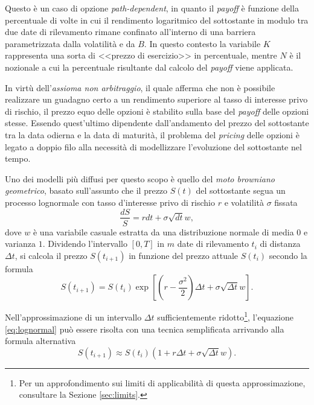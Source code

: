 Questo è un caso di opzione \textit{path-dependent}, in quanto il \textit{payoff} è funzione della percentuale di volte in cui il rendimento logaritmico del sottostante in modulo tra due date di rilevamento rimane confinato all'interno di una barriera parametrizzata dalla volatilità e da $B$. In questo contesto la variabile $K$ rappresenta una sorta di <<prezzo di esercizio>> in percentuale, mentre $N$ è il nozionale a cui la percentuale risultante dal calcolo del \textit{payoff} viene applicata.

In virtù dell'\textit{assioma non arbitraggio}, il quale afferma che non è possibile realizzare un guadagno certo a un rendimento superiore al tasso di interesse privo di rischio, il prezzo equo delle opzioni è stabilito sulla base del \textit{payoff} delle opzioni stesse. Essendo quest'ultimo dipendente dall'andamento del prezzo del sottostante tra la data odierna e la data di maturità, il problema del \textit{pricing} delle opzioni è legato a doppio filo alla necessità di modellizzare l'evoluzione del sottostante nel tempo.

Uno dei modelli più diffusi per questo scopo è quello del \textit{moto browniano geometrico}, basato sull'assunto che il prezzo $S(t)$ del sottostante segua un processo lognormale con tasso d'interesse privo di rischio $r$ e volatilità $\sigma$ fissata
\begin{equation}
    \frac{dS}{S} = r dt + \sigma \sqrt{dt} w,
    \label{eq:lognormal}
\end{equation}
dove $w$ è una variabile casuale estratta da una distribuzione normale di media $0$ e varianza $1$. Dividendo l'intervallo $[0,T]$ in $m$ date di rilevamento $t_i$ di distanza $\Delta t$, si calcola il prezzo $S(t_{i+1})$ in funzione del prezzo attuale $S(t_i)$ secondo la formula
\begin{equation}
    S(t_{i+1}) = S(t_i) \exp{\left[\left(r- \frac{\sigma^2}{2}\right)\Delta t + \sigma \sqrt{\Delta t} w\right]}.
    \label{eq:exactprice}
\end{equation}

Nell'approssimazione di un intervallo $\Delta t$ sufficientemente ridotto\footnote{Per un approfondimento sui limiti di applicabilità di questa approssimazione, consultare la Sezione \ref{sec:limits}.}, l'equazione \eqref{eq:lognormal} può essere risolta con una tecnica semplificata arrivando alla formula alternativa
\begin{equation}
    S(t_{i+1}) \approx S(t_i) \left(1 + r \Delta t + \sigma \sqrt{\Delta t} w\right).
    \label{eq:eulerprice}
\end{equation}

